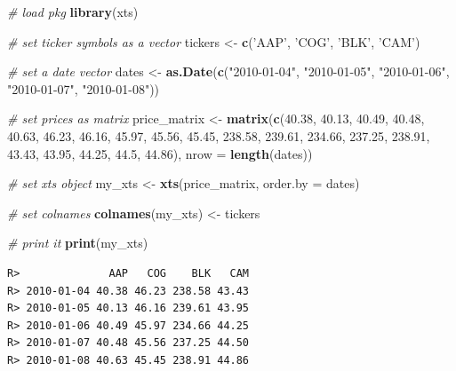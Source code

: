 \documentclass[
  12pt,
]{book}
\newenvironment{Shaded}{\begin{snugshade}}{\end{snugshade}}
\newcommand{\CommentTok}[1]{\textcolor[rgb]{0.37,0.37,0.37}{\textit{#1}}}
\newcommand{\DataTypeTok}[1]{\textcolor[rgb]{0.27,0.27,0.27}{#1}}
\newcommand{\FloatTok}[1]{\textcolor[rgb]{0.06,0.06,0.06}{#1}}
\newcommand{\KeywordTok}[1]{\textcolor[rgb]{0.27,0.27,0.27}{\textbf{#1}}}
\newcommand{\NormalTok}[1]{#1}
\newcommand{\StringTok}[1]{\textcolor[rgb]{0.5,0.5,0.5}{#1}}
\begin{document}
\begin{Shaded}
\begin{Highlighting}[]
\CommentTok{# load pkg}
\KeywordTok{library}\NormalTok{(xts)}

\CommentTok{# set ticker symbols as a vector}
\NormalTok{tickers <-}\StringTok{ }\KeywordTok{c}\NormalTok{(}\StringTok{'AAP'}\NormalTok{, }\StringTok{'COG'}\NormalTok{, }\StringTok{'BLK'}\NormalTok{, }\StringTok{'CAM'}\NormalTok{)}

\CommentTok{# set a date vector}
\NormalTok{dates <-}\StringTok{ }\KeywordTok{as.Date}\NormalTok{(}\KeywordTok{c}\NormalTok{(}\StringTok{"2010-01-04"}\NormalTok{, }\StringTok{"2010-01-05"}\NormalTok{, }\StringTok{"2010-01-06"}\NormalTok{, }
                   \StringTok{"2010-01-07"}\NormalTok{, }\StringTok{"2010-01-08"}\NormalTok{))}

\CommentTok{# set prices as  matrix                   }
\NormalTok{price_matrix <-}\StringTok{ }\KeywordTok{matrix}\NormalTok{(}\KeywordTok{c}\NormalTok{(}\FloatTok{40.38}\NormalTok{,  }\FloatTok{40.13}\NormalTok{,  }\FloatTok{40.49}\NormalTok{,  }\FloatTok{40.48}\NormalTok{,  }\FloatTok{40.63}\NormalTok{,}
                         \FloatTok{46.23}\NormalTok{,  }\FloatTok{46.16}\NormalTok{,  }\FloatTok{45.97}\NormalTok{,  }\FloatTok{45.56}\NormalTok{,  }\FloatTok{45.45}\NormalTok{,}
                         \FloatTok{238.58}\NormalTok{, }\FloatTok{239.61}\NormalTok{, }\FloatTok{234.66}\NormalTok{, }\FloatTok{237.25}\NormalTok{, }\FloatTok{238.91}\NormalTok{,}
                         \FloatTok{43.43}\NormalTok{,  }\FloatTok{43.95}\NormalTok{,  }\FloatTok{44.25}\NormalTok{,  }\FloatTok{44.5}\NormalTok{,   }\FloatTok{44.86}\NormalTok{),}
                       \DataTypeTok{nrow =} \KeywordTok{length}\NormalTok{(dates))}

\CommentTok{# set xts object}
\NormalTok{my_xts <-}\StringTok{ }\KeywordTok{xts}\NormalTok{(price_matrix, }\DataTypeTok{order.by =}\NormalTok{ dates)}

\CommentTok{# set colnames}
\KeywordTok{colnames}\NormalTok{(my_xts) <-}\StringTok{ }\NormalTok{tickers}

\CommentTok{# print it}
\KeywordTok{print}\NormalTok{(my_xts)}
\end{Highlighting}
\end{Shaded}

\begin{verbatim}
R>              AAP   COG    BLK   CAM
R> 2010-01-04 40.38 46.23 238.58 43.43
R> 2010-01-05 40.13 46.16 239.61 43.95
R> 2010-01-06 40.49 45.97 234.66 44.25
R> 2010-01-07 40.48 45.56 237.25 44.50
R> 2010-01-08 40.63 45.45 238.91 44.86
\end{verbatim}
\end{document}
